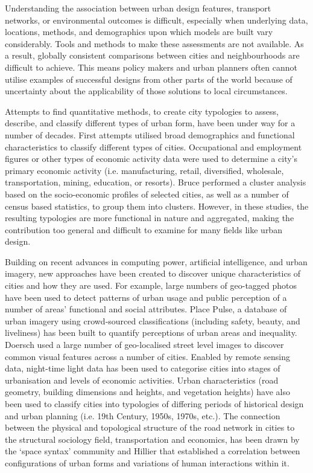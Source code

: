 \documentclass{nature}
\begin{document}
Understanding the association between urban design features, transport networks, or environmental outcomes is difficult, especially when underlying data, locations, methods, and demographics upon which models are built vary considerably. Tools and methods to make these assessments are not available. As a result, globally consistent comparisons between cities and neighbourhoods are difficult to achieve. This means policy makers and urban planners often cannot utilise examples of successful designs from other parts of the world because of uncertainty about the applicability of those solutions to local circumstances.

Attempts to find quantitative methods, to create city typologies to assess, describe, and classify different types of urban form, have been under way for a number of decades. First attempts utilised broad demographics and functional characteristics to classify different types of cities. Occupational and employment figures\cite{Harris1943} or other types of economic activity data\cite{Nelson1955} were used to determine a city's primary economic activity (i.e. manufacturing, retail, diversified, wholesale, transportation, mining, education, or resorts). Bruce\cite{Bruce1971} performed a cluster analysis based on the socio-economic profiles of selected cities, as well as a number of census based statistics, to group them into clusters. However, in these studies, the resulting typologies are more functional in nature and aggregated, making the contribution too general and difficult to examine for many fields like urban design.

Building on recent advances in computing power, artificial intelligence, and urban imagery, new approaches have been created to discover unique characteristics of cities and how they are used. For example, large numbers of geo-tagged photos have been used to detect patterns of urban usage and public perception of a number of areas' functional and social attributes\cite{Liu2016,Zhou2014a}. Place Pulse, a database of urban imagery using crowd-sourced classifications (including safety, beauty, and liveliness) has been built to quantify perceptions of urban areas\cite{Dubey2016,Naik2014} and inequality\cite{Salesses2013}. Doersch\cite{Doersch2012} used a large number of geo-localised street level images to discover common visual features across a number of cities. Enabled by remote sensing data, night-time light data has been used to categorise cities into stages of urbanisation and levels of economic activities\cite{Zhang2013}. Urban characteristics (road geometry, building dimensions and heights, and vegetation heights) have also been used to classify cities into typologies of differing periods of historical design and urban planning (i.e. 19th Century, 1950s, 1970s, etc.)\cite{Hermosilla2014}. The connection between the physical and topological structure of the road network in cities to the structural sociology field, transportation and economics, has been drawn by the `space syntax' community and Hillier\cite{Hillier1996} that established a correlation between configurations of urban forms and variations of human interactions within it.  
\end{document}
